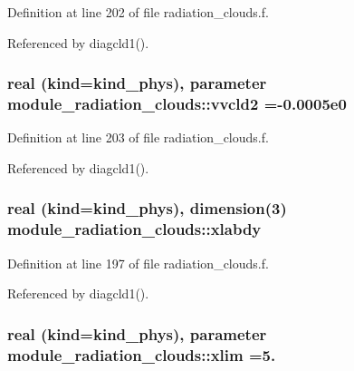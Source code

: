 Definition at line 202 of file radiation\+\_\+clouds.\+f.



Referenced by diagcld1().

\subsubsection[{\texorpdfstring{vvcld2}{vvcld2}}]{\setlength{\rightskip}{0pt plus 5cm}real (kind=kind\+\_\+phys), parameter module\+\_\+radiation\+\_\+clouds\+::vvcld2 =-\/0.\+0005e0\hspace{0.3cm}{\ttfamily [private]}}\hypertarget{namespacemodule__radiation__clouds_a67962e77fb073cc25cafaaba0c2fa833}{}\label{namespacemodule__radiation__clouds_a67962e77fb073cc25cafaaba0c2fa833}


Definition at line 203 of file radiation\+\_\+clouds.\+f.



Referenced by diagcld1().

\subsubsection[{\texorpdfstring{xlabdy}{xlabdy}}]{\setlength{\rightskip}{0pt plus 5cm}real (kind=kind\+\_\+phys), dimension(3) module\+\_\+radiation\+\_\+clouds\+::xlabdy\hspace{0.3cm}{\ttfamily [private]}}\hypertarget{namespacemodule__radiation__clouds_ab2a798da0bb0125d1d5074b73c5951dc}{}\label{namespacemodule__radiation__clouds_ab2a798da0bb0125d1d5074b73c5951dc}


Definition at line 197 of file radiation\+\_\+clouds.\+f.



Referenced by diagcld1().

\subsubsection[{\texorpdfstring{xlim}{xlim}}]{\setlength{\rightskip}{0pt plus 5cm}real (kind=kind\+\_\+phys), parameter module\+\_\+radiation\+\_\+clouds\+::xlim =5.\hspace{0.3cm}{\ttfamily [private]}}\hypertarget{namespacemodule__radiation__clouds_a1146f43b680b655d354a9c031ee4a463}{}\label{namespacemodule__radiation__clouds_a1146f43b680b655d354a9c031ee4a463}


